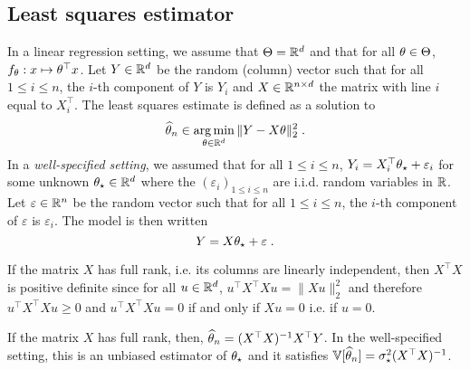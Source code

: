 \subsection{Least squares estimator}
In a linear regression setting, we assume that $\Theta = \mathbb{R}^d$ and that  for all $\theta\in\Theta$, $f_\theta: x \mapsto \theta^\top x$.  Let $Y\in\mathbb{R}^d$  be the random (column) vector such that  for all $1\leqslant i \leqslant n$, the $i$-th component of $Y$ is $Y_i$  and $X\in\mathbb{R}^{n\times d}$ the matrix with line $i$ equal to $X^\top_i$. 
The least squares estimate is defined as a solution to
\[
\widehat \param_n\in  \argmin_{\param\in\rset^d}  \|Y - X\param\|_2^2\eqsp.
\]
In a {\em well-specified setting}, we assumed that  for all $1\leqslant i \leqslant n$, $Y_i = X^\top_i \theta_{\star} + \varepsilon_i$ for some unknown $\theta_\star\in\mathbb{R}^d$ where the $(\varepsilon_i)_{1\leqslant i\leqslant n}$ are i.i.d. random variables in $\mathbb{R}$. Let  $\varepsilon\in\mathbb{R}^n$  be the random vector such that  for all $1\leqslant i \leqslant n$, the $i$-th component of $\varepsilon$  is $\varepsilon_i$. The model is then written
\[
Y = X \theta_{\star} + \varepsilon\;.
\]

\begin{remark}
If the matrix $X$ has full rank, i.e. its columns are linearly independent, then $X^\top X$ is positive definite since for all $u\in\mathbb{R}^d$, $u^\top X^\top X u = \|Xu\|_2^2$ and therefore  $u^\top X^\top X u \geqslant 0$ and $u^\top X^\top X u = 0$ if and only if $Xu = 0$ i.e. if $u=0$.
\end{remark}

\begin{shaded}
\begin{proposition}
\label{prop:least:squares:full:rank}
If the matrix $X$ has full rank, then, $\widehat {\theta}_n = (X^\top X)^{-1}X^\top Y$. In the well-specified setting, this  is an unbiased estimator of $\theta_\star$ and it satisfies $\mathbb{V}[\widehat {\theta}_n] = \sigma_\star^2 (X^\top X)^{-1}$.
\end{proposition}
\end{shaded}

